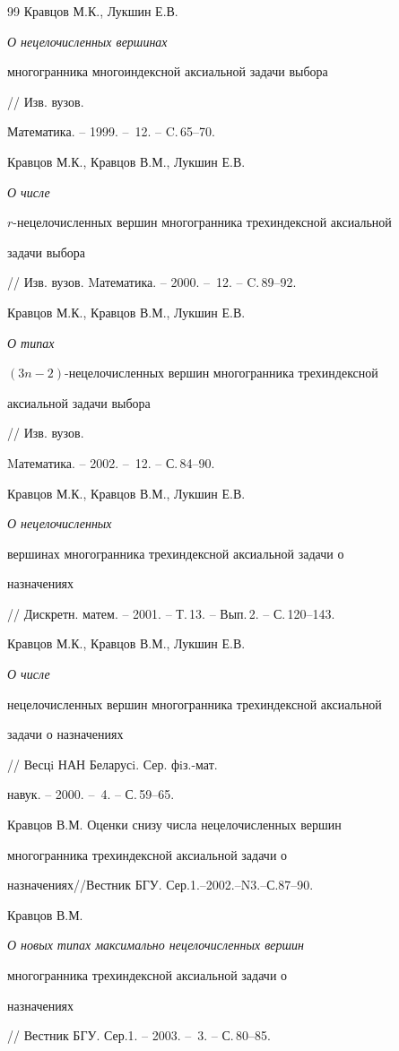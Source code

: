 \begin{thebibliography}{99}
Кравцов М.К., Лукшин Е.В. {\em О нецелочисленных вершинах


многогранника многоиндексной аксиальной задачи выбора} // Изв. вузов.


Математика. -- 1999. -- \No\,12. -- C.\,65--70.




Кравцов М.К., Кравцов В.М., Лукшин Е.В. {\em О числе


$r$-нецелочисленных вершин многогранника трехиндексной аксиальной


задачи выбора} // Изв. вузов. Mатематика. -- 2000. -- \No\,12. -- C.\,89--92.




Кравцов М.К., Кравцов В.М., Лукшин Е.В. {\em О типах


$(3n-2)$-нецелочисленных вершин многогранника трехиндексной


аксиальной задачи выбора} // Изв. вузов.


Mатематика. -- 2002. -- \No\,12. -- С.\,84--90.




Кравцов М.К., Кравцов В.М., Лукшин Е.В. {\em О нецелочисленных


вершинах многогранника трехиндексной аксиальной задачи о


назначениях} // Дискретн. матем. -- 2001. -- Т.\,13. -- Вып.\,2. -- С.\,120--143.




Кравцов М.К., Кравцов В.М., Лукшин Е.В. {\em О числе


нецелочисленных вершин многогранника трехиндексной аксиальной


задачи о назначениях} // Весцi НАН Беларусi. Сер. фiз.-мат.


навук. -- 2000. -- \No\,4. -- С.\,59--65.




Кравцов В.М. Оценки снизу числа нецелочисленных вершин


многогранника трехиндексной аксиальной задачи о


назначениях//Вестник БГУ. Сер.1.--2002.--N3.--С.87--90.




Кравцов В.М. {\em О новых типах максимально нецелочисленных вершин


многогранника трехиндексной аксиальной задачи о


назначениях} // Вестник БГУ. Сер.1. -- 2003. -- \No\,3. -- С.\,80--85.



\end{thebibliography}

